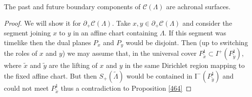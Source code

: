 
\begin{proposition}\label{466}
The past and future boundary components of $\mathcal{C}(\Lambda)$ are achronal surfaces.
\end{proposition}
\begin{proof}
    We will show it for $\partial_+\mathcal{C}(\Lambda)$. Take $x,y\in\partial_+\mathcal{C}(\Lambda)$ and consider the segment joining $x$ to $y$ in an affine chart containing $\Lambda$. If this segment was timelike then the dual planes $P_x$ and $P_y$ would be disjoint. Then (up to switching the roles of $x$ and $y$) we may assume that, in the universal cover $P_{\widetilde{x}}^1\subset I^+(P_{\widetilde{y}}^1)$, where $\widetilde{x}$ and $\widetilde{y}$ are the lifting of $x$ and $y$ in the same Dirichlet region mapping to the fixed affine chart. But then $S_+(\widetilde{\Lambda})$ would be contained in $\text{I}^-(P_{\widetilde{y}}^1)$ and could not meet $P_{\widetilde{x}}^1$ thus a contradiction to Proposition \ref{464}
\end{proof}
    
